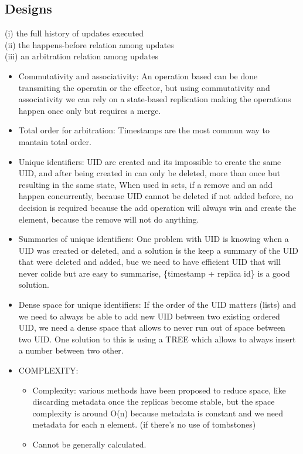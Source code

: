 \documentclass{article}
\begin{document}
\subsection{Designs}
(i) the full history of updates executed \\ (ii) the happens-before relation
among updates \\ (iii) an arbitration relation among updates 
\begin{itemize}
    \item Commutativity and associativity: An operation based can be done transmiting the operatin or the effector, but using commutativity and associativity we can rely on a state-based replication making the operations happen once only but requires a merge.
    \item Total order for arbitration: Timestamps are the most commun way to mantain total order.
    \item Unique identifiers: UID are created and its impossible to create the same UID, and after being created in can only be deleted, more than once but resulting in the same state, When used in sets, if a remove and an add happen concurrently, because UID cannot be deleted if not added before, no decision is required because the add operation will always win and create the element, because the remove will not do anything.
    \item Summaries of unique identifiers: One problem with UID is knowing when a UID was created or deleted, and a solution is the keep a summary of the UID that were deleted and added, bue we need to have efficient UID that will never colide but are easy to summarise, \{timestamp + replica id\} is a good solution.
    \item Dense space for unique identifiers: If the order of the UID matters (lists) and we need to always be able to add new UID between two existing ordered UID, we need a dense space that allows to never run out of space between two UID. One solution to this is using a TREE which allows to always insert a number between two other.
    \item COMPLEXITY:
    \begin{itemize}
        \item Complexity: various methods have been proposed to reduce space, like discarding metadata once the replicas become stable, but the space complexity is around O(n) because metadata is constant and we need metadata for each n element. (if there's no use of tombstones)
        \item Cannot be generally calculated.
    \end{itemize}
\end{itemize}
\end{document}

